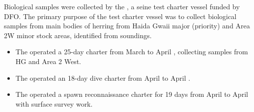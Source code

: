 Biological samples were collected by the ,
a seine test charter vessel funded by DFO.
The primary purpose of the test charter vessel was to
collect biological samples from main bodies of herring from
Haida Gwaii major (priority) and Area 2W minor stock areas,
identified from soundings.

\begin{itemize}

\item The  operated a 25-day charter
from March  to April ,
collecting samples from HG and Area 2 West.

\item The  operated an 18-day dive charter
from April  to April .

\item The  operated a spawn reconnaissance charter
for 19 days from April  to April  with surface survey work.

\end{itemize}